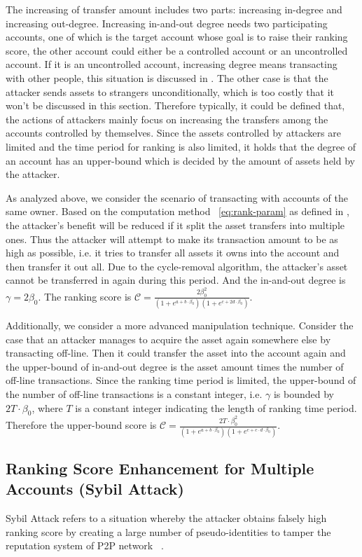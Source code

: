 The increasing of transfer amount includes two parts: increasing in-degree and increasing out-degree. Increasing in-and-out degree needs two participating accounts, one of which is the target account whose goal is to raise their ranking score, the other account could either be a controlled account or an uncontrolled account. If it is an uncontrolled account, increasing degree means transacting with other people, this situation is discussed in . The other case is that the attacker sends assets to strangers unconditionally, which is too costly that it won't be discussed in this section. Therefore typically, it could be defined that, the actions of attackers mainly focus on increasing the transfers among the accounts controlled by themselves. Since the assets controlled by attackers are limited and the time period for ranking is also limited, it holds that the degree of an account has an upper-bound which is decided by the amount of assets held by the attacker.

As analyzed above, we consider the scenario of transacting with accounts of the same owner. Based on the computation method ~\ref{eq:rank-param} as defined in , the attacker's benefit will be reduced if it split the asset transfers into multiple ones. Thus the attacker will attempt to make its transaction amount to be as high as possible, i.e. it tries to transfer all assets it owns into the account and then transfer it out all. Due to the cycle-removal algorithm, the attacker's asset cannot be transferred in again during this period. And the in-and-out degree is $\gamma = 2 \beta_0$. The ranking score is $\mathcal{C} =  \frac{2 \beta_0 ^2}{ (1+e^{a + b \cdot \beta_0}) (1+e^{c + 2 d \cdot \beta_0})}$.

Additionally, we consider a more advanced manipulation technique. Consider the case that an attacker manages to acquire the asset again somewhere else by transacting off-line. Then it could transfer the asset into the account again and the upper-bound of in-and-out degree is the asset amount times the number of off-line transactions. Since the ranking time period is limited, the upper-bound of the number of off-line transactions is a constant integer, i.e. $\gamma$ is bounded by $2T \cdot \beta_0$, where $T$ is a constant integer indicating the length of ranking time period. Therefore the upper-bound score is $\mathcal{C} =  \frac{2T \cdot \beta_0 ^2}{ (1+e^{a + b \cdot \beta_0}) (1+e^{c + c \cdot d \cdot \beta_0})}$.

\subsection{Ranking Score Enhancement for Multiple Accounts (Sybil Attack)}
Sybil Attack refers to a situation whereby the attacker obtains falsely high ranking score by creating a large number of pseudo-identities to tamper the reputation system of P2P network ~\cite{quercia2010sybil}.

